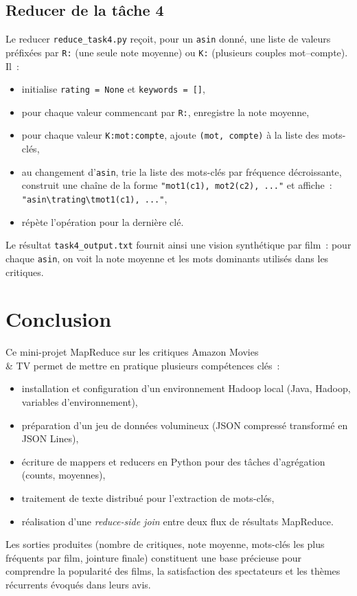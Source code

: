 \documentclass[a4paper,11pt]{article}
\begin{document}
\subsection{Reducer de la tâche 4}

Le reducer \texttt{reduce\_task4.py} reçoit, pour un \texttt{asin}
donné, une liste de valeurs préfixées par \texttt{R:} (une seule
note moyenne) ou \texttt{K:} (plusieurs couples mot--compte). Il~:
\begin{itemize}
  \item initialise \texttt{rating = None} et \texttt{keywords = []},\
  \item pour chaque valeur commencant par \texttt{R:}, enregistre
        la note moyenne,\
  \item pour chaque valeur \texttt{K:mot:compte}, ajoute \texttt{(mot, compte)}
        à la liste des mots-clés,\
  \item au changement d'\texttt{asin}, trie la liste des mots-clés
        par fréquence décroissante, construit une chaîne de la forme
        \texttt{"mot1(c1), mot2(c2), ..."} et affiche~:\\
        \texttt{"asin\textbackslash trating\textbackslash tmot1(c1), ..."},\
  \item répète l'opération pour la dernière clé.
\end{itemize}

Le résultat \texttt{task4\_output.txt} fournit ainsi une vision
synthétique par film~: pour chaque \texttt{asin}, on voit la note
moyenne et les mots dominants utilisés dans les critiques.

\section{Conclusion}

Ce mini-projet MapReduce sur les critiques Amazon Movies \\& TV
permet de mettre en pratique plusieurs compétences clés~:
\begin{itemize}
  \item installation et configuration d'un environnement Hadoop
        local (Java, Hadoop, variables d'environnement),\
  \item préparation d'un jeu de données volumineux (JSON compressé
        transformé en JSON Lines),\
  \item écriture de mappers et reducers en Python pour des tâches
        d'agrégation (counts, moyennes),\
  \item traitement de texte distribué pour l'extraction de mots-clés,\
  \item réalisation d'une \emph{reduce-side join} entre deux flux
        de résultats MapReduce.
\end{itemize}

Les sorties produites (nombre de critiques, note moyenne, mots-clés
les plus fréquents par film, jointure finale) constituent une base
précieuse pour comprendre la popularité des films, la satisfaction
des spectateurs et les thèmes récurrents évoqués dans leurs avis.
\end{document}
